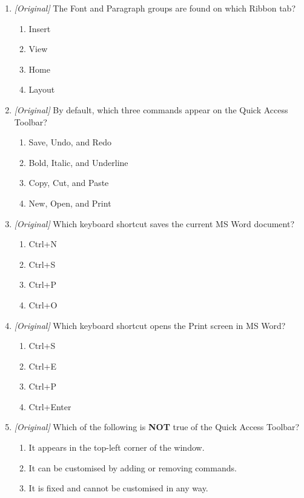 \documentclass[11pt]{article}
\begin{document}
\begin{enumerate}[label=\textbf{Q\arabic*.}, leftmargin=*]
\begin{enumerate}[label=\Alph*.]
  \end{enumerate}
\item \textit{[Original]} The Font and Paragraph groups are found on which
  Ribbon tab?
  \begin{enumerate}[label=\Alph*.]
    \item Insert
    \item View
    \item Home
    \item Layout
  \end{enumerate}
\item \textit{[Original]} By default, which three commands appear on the
  Quick Access Toolbar?
  \begin{enumerate}[label=\Alph*.]
    \item Save, Undo, and Redo
    \item Bold, Italic, and Underline
    \item Copy, Cut, and Paste
    \item New, Open, and Print
  \end{enumerate}
\item \textit{[Original]} Which keyboard shortcut saves the current MS Word
  document?
  \begin{enumerate}[label=\Alph*.]
    \item Ctrl+N
    \item Ctrl+S
    \item Ctrl+P
    \item Ctrl+O
  \end{enumerate}
\item \textit{[Original]} Which keyboard shortcut opens the Print screen in
  MS Word?
  \begin{enumerate}[label=\Alph*.]
    \item Ctrl+S
    \item Ctrl+E
    \item Ctrl+P
    \item Ctrl+Enter
  \end{enumerate}
\item \textit{[Original]} Which of the following is \textbf{NOT} true of the
  Quick Access Toolbar?
  \begin{enumerate}[label=\Alph*.]
    \item It appears in the top-left corner of the window.
    \item It can be customised by adding or removing commands.
    \item It is fixed and cannot be customised in any way.

\end{enumerate}
\end{enumerate}
\end{document}
